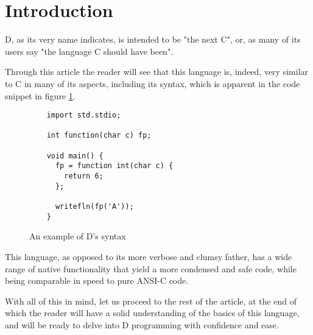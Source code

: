\section{Introduction} \label{sec:introduction}


D, as its very name indicates, is intended to be "the next C", or, as many of its users say "the language C should have been".

Through this article the reader will see that this language is, indeed, very similar to C in many of its aspects, including its syntax, which is apparent in the code snippet in figure \ref{fig:d_syntax_code_example}.

\begin{figure}
  \caption{An example of D's syntax}
  \label{fig:d_syntax_code_example}
  \begin{lstlisting}
    import std.stdio;

    int function(char c) fp;

    void main() {
      fp = function int(char c) {
        return 6;
      };

      writefln(fp('A'));
    }
  \end{lstlisting}
\end{figure}

This language, as opposed to its more verbose and clumsy father, has a wide range of native functionality that yield a more condensed and safe code, while being comparable in speed to pure ANSI-C code.

With all of this in mind, let us proceed to the rest of the article, at the end of which the reader will have a solid understanding of the basics of this language, and will be ready to delve into D programming with confidence and ease.
